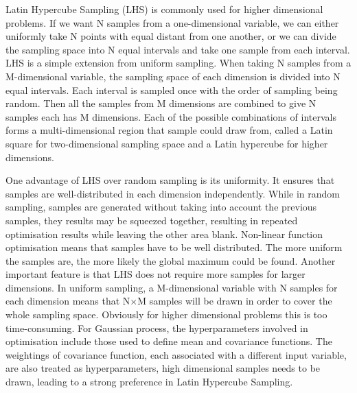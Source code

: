 \documentclass[11pt]{report}
\numberwithin{equation}{chapter}
\begin{document}
\begin{spacing}{2}
Latin Hypercube Sampling (LHS)\cite{mckay2000comparison} is commonly used for higher dimensional problems. If we want N samples from a one-dimensional variable, we can either uniformly take N points with equal distant from one another, or we can divide the sampling space into N equal intervals and take one sample from each interval. LHS is a simple extension from uniform sampling. When taking N samples from a M-dimensional variable, the sampling space of each dimension is divided into N equal intervals. Each interval is sampled once with the order of sampling being random. Then all the samples from M dimensions are combined to give N samples each has M dimensions. Each of the possible combinations of intervals forms a multi-dimensional region that sample could draw from, called a Latin square for two-dimensional sampling space and a Latin hypercube for higher dimensions. 

One advantage of LHS over random sampling is its uniformity. It ensures that samples are well-distributed in each dimension independently. While in random sampling, samples are generated without taking into account the previous samples, they results may be squeezed together, resulting in repeated optimisation results while leaving the other area blank. Non-linear function optimisation means that samples have to be well distributed. The more uniform the samples are, the more likely the global maximum could be found. Another important feature is that LHS does not require more samples for larger dimensions. In uniform sampling, a M-dimensional variable with N samples for each dimension means that N$\times$M samples will be drawn in order to cover the whole sampling space. Obviously for higher dimensional problems this is too time-consuming. For Gaussian process, the hyperparameters involved in optimisation include those used to define mean and covariance functions. The weightings of covariance function, each associated with a different input variable, are also treated as hyperparameters, high dimensional samples needs to be drawn, leading to a strong preference in Latin Hypercube Sampling.  


\end{spacing}
\end{document}
